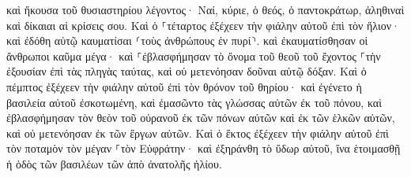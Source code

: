 \documentclass{openreader}
\begin{document}
καὶ ἤκουσα τοῦ θυσιαστηρίου λέγοντος· Ναί, κύριε, ὁ θεός, ὁ παντοκράτωρ, ἀληθιναὶ καὶ δίκαιαι αἱ κρίσεις σου. 
Καὶ ὁ ⸀τέταρτος ἐξέχεεν τὴν φιάλην αὐτοῦ ἐπὶ τὸν ἥλιον· καὶ ἐδόθη αὐτῷ καυματίσαι ⸂τοὺς ἀνθρώπους ἐν πυρί⸃. 
καὶ ἐκαυματίσθησαν οἱ ἄνθρωποι καῦμα μέγα· καὶ ⸀ἐβλασφήμησαν τὸ ὄνομα τοῦ θεοῦ τοῦ ἔχοντος ⸀τὴν ἐξουσίαν ἐπὶ τὰς πληγὰς ταύτας, καὶ οὐ μετενόησαν δοῦναι αὐτῷ δόξαν. 
Καὶ ὁ πέμπτος ἐξέχεεν τὴν φιάλην αὐτοῦ ἐπὶ τὸν θρόνον τοῦ θηρίου· καὶ ἐγένετο ἡ βασιλεία αὐτοῦ ἐσκοτωμένη, καὶ ἐμασῶντο τὰς γλώσσας αὐτῶν ἐκ τοῦ πόνου, 
καὶ ἐβλασφήμησαν τὸν θεὸν τοῦ οὐρανοῦ ἐκ τῶν πόνων αὐτῶν καὶ ἐκ τῶν ἑλκῶν αὐτῶν, καὶ οὐ μετενόησαν ἐκ τῶν ἔργων αὐτῶν. 
Καὶ ὁ ἕκτος ἐξέχεεν τὴν φιάλην αὐτοῦ ἐπὶ τὸν ποταμὸν τὸν μέγαν ⸀τὸν Εὐφράτην· καὶ ἐξηράνθη τὸ ὕδωρ αὐτοῦ, ἵνα ἑτοιμασθῇ ἡ ὁδὸς τῶν βασιλέων τῶν ἀπὸ ἀνατολῆς ἡλίου. 
\end{document}
